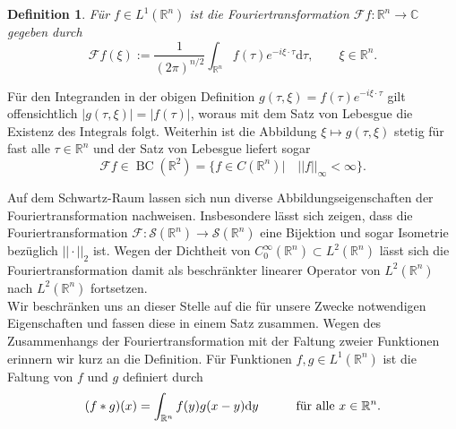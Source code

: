 \documentclass[12pt,a4paper]{scrartcl}
\newtheorem{Def}[Satz]{Definition}
\newcommand{\dd}{\mathrm{d}}
\numberwithin{equation}{section}
\newcommand{\C}{\mathbb{C}} %
\newcommand{\R}{\mathbb{R}} %
\newcommand{\F}{\mathcal{F}} %
\newcommand{\Sc}{\mathcal{S}} %
\newcommand{\BC}{\operatorname{BC}}
\newcommand{\fa}{\text{\quad für alle }}
\begin{document}
\begin{Def}
Für $f \in L^1 (\R^n)$ ist die \emph{Fouriertransformation} $\F f : \R^n \to \C$ gegeben durch
\[
	\F f (\xi) := \frac{1}{(2 \pi)^{n/2}} \int_{\R^n} f(\tau) e^{-i \xi \cdot \tau} \dd \tau, \qquad \xi \in \R^n.
\]
\end{Def}
Für den Integranden in der obigen Definition $g(\tau,\xi)=  f(\tau) e^{-i \xi \cdot \tau}$ gilt offensichtlich $|g(\tau,\xi)|=|f(\tau)|$, woraus mit dem Satz von Lebesgue die Existenz des Integrals folgt. Weiterhin ist die Abbildung $\xi \mapsto g(\tau,\xi)$ stetig für fast alle $\tau \in \R^n$ und der Satz von Lebesgue liefert sogar 
\[
\F f \in \BC(\R^2)=\{f \in C(\R^n)| \quad ||f||_\infty < \infty \}.
\]

Auf dem Schwartz-Raum lassen sich nun diverse Abbildungseigenschaften der Fouriertransformation nachweisen. Insbesondere lässt sich zeigen, dass die Fouriertransformation $\F : \Sc(\R^n) \to \Sc(\R^n)$ eine Bijektion und sogar Isometrie bezüglich $||\cdot ||_2$ ist. Wegen der Dichtheit von $C_0^\infty(\R^n) \subset L^2(\R^n)$ lässt sich die Fouriertransformation damit als beschränkter linearer Operator von $L^2(\R^n)$ nach $L^2(\R^n)$ fortsetzen. \\
Wir beschränken uns an dieser Stelle auf die für unsere Zwecke notwendigen Eigenschaften und fassen diese in einem Satz zusammen. Wegen des Zusammenhangs der Fouriertransformation mit der Faltung zweier Funktionen erinnern wir kurz an die Definition.
Für Funktionen $f,g \in L^1(\R^n)$ ist die Faltung von $f$ und $g$ definiert durch
\[
(f \ast g)(x) = \int_{\R^n} f(y) g(x-y) \dd y \qquad \fa x \in \R^n.
\]
\end{document}
